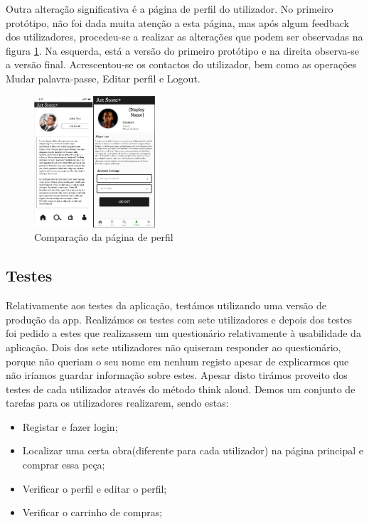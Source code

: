 \documentclass[conference]{IEEEtran}
\begin{document}
Outra alteração significativa é a página de perfil do utilizador. No primeiro protótipo, 
não foi dada muita atenção a esta página, mas após algum feedback dos utilizadores, procedeu-se 
a realizar as alterações que podem ser observadas na figura \ref{fig:profilevs}. Na esquerda, 
está a versão do primeiro protótipo e na direita observa-se a versão final. Acrescentou-se 
os contactos do utilizador, bem como as operações Mudar palavra-passe, Editar perfil e Logout.

\begin{figure}[h]
    \centering
    \includegraphics[width=0.4\textwidth]{profile-early-vs-latest.png}
    \caption{Comparação da página de perfil}
    \label{fig:profilevs}
\end{figure}

\subsection{Testes}

Relativamente aos testes da aplicação, testámos utilizando uma versão de produção da app. 
Realizámos os testes com sete utilizadores e depois dos testes foi pedido a estes que 
realizassem um questionário relativamente à usabilidade da aplicação. 
Dois dos sete utilizadores não quiseram responder ao questionário, 
porque não queriam o seu nome em nenhum registo apesar de explicarmos que 
não iríamos guardar informação sobre estes. Apesar disto tirámos proveito 
dos testes de cada utilizador através do método think aloud. Demos um conjunto de 
tarefas para os utilizadores realizarem, sendo estas:

\begin{itemize}
    \item Registar e fazer login;
    \item Localizar uma certa obra(diferente para cada utilizador) na página principal e comprar essa peça;
    \item Verificar o perfil e editar o perfil;
    \item Verificar o carrinho de compras;
\end{itemize}
\end{document}
